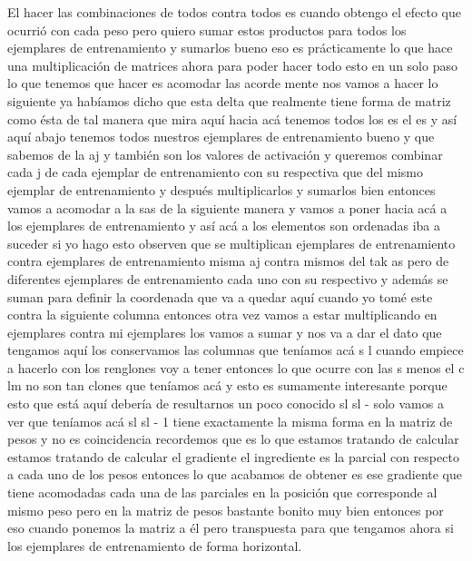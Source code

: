 El hacer las combinaciones de todos contra todos es cuando obtengo el efecto que ocurrió con cada peso pero quiero sumar estos productos para todos los ejemplares de entrenamiento y sumarlos bueno eso es prácticamente lo que hace una multiplicación de matrices ahora para poder hacer todo esto en un solo paso lo que tenemos que hacer es acomodar las acorde mente nos vamos a hacer lo siguiente ya habíamos dicho que esta delta que realmente tiene forma de matriz como ésta de tal manera que mira aquí hacia acá tenemos todos los es el es y así aquí abajo tenemos todos nuestros ejemplares de entrenamiento bueno y que sabemos de la aj y también son los valores de activación y queremos combinar cada j de cada ejemplar de entrenamiento con su respectiva que del mismo ejemplar de entrenamiento y después multiplicarlos y sumarlos bien entonces vamos a acomodar a la sas de la siguiente manera y vamos a poner hacia acá a los ejemplares de entrenamiento y así acá a los elementos son ordenadas iba a suceder si yo hago esto observen que se multiplican ejemplares de entrenamiento contra ejemplares de entrenamiento misma aj contra mismos del tak as pero de diferentes ejemplares de entrenamiento cada uno con su respectivo y además se suman para definir la coordenada que va a quedar aquí cuando yo tomé este contra la siguiente columna entonces otra vez vamos a estar multiplicando en ejemplares contra mi ejemplares los vamos a sumar y nos va a dar el dato que tengamos aquí los conservamos las columnas que teníamos acá s l cuando empiece a hacerlo con los renglones voy a tener entonces lo que ocurre con las s menos el c lm no son tan clones que teníamos acá y esto es sumamente interesante porque esto que está aquí debería de resultarnos un poco conocido sl sl - solo vamos a ver que teníamos acá sl sl - 1 tiene exactamente la misma forma en la matriz de pesos y no es coincidencia recordemos que es lo que estamos tratando de calcular estamos tratando de calcular el gradiente el ingrediente es la parcial con respecto a cada uno de los pesos entonces lo que acabamos de obtener es ese gradiente que tiene acomodadas cada una de las parciales en la posición que corresponde al mismo peso pero en la matriz de pesos bastante bonito muy bien entonces por eso cuando ponemos la matriz a él pero transpuesta para que tengamos ahora si los ejemplares de entrenamiento de forma horizontal. 
